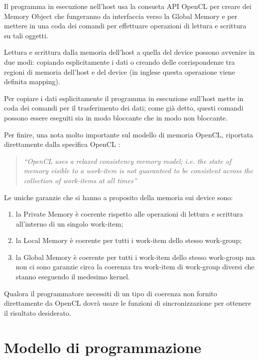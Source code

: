 \documentclass[12pt,a4paper,oneside]{book}
\begin{document}
Il programma in esecuzione nell'host usa la consueta \ac{API} \ac{OpenCL} per creare dei Memory Object che fungeranno da interfaccia verso la Global Memory e per mettere in una coda dei comandi per effettuare operazioni di lettura e scrittura su tali oggetti.

Lettura e scrittura dalla memoria dell'host a quella del device possono avvenire in due modi: copiando esplicitamente i dati o creando delle corrispondenze tra regioni di memoria dell'host e del device (in inglese questa operazione viene definita mapping).

Per copiare i dati esplicitamente il programma in esecuzione sull'host mette in coda dei comandi per il trasferimento dei dati; come già detto, questi comandi possono essere eseguiti sia in modo bloccante che in modo non bloccante.

Per finire, una nota molto importante sul modello di memoria \ac{OpenCL}, riportata direttamente dalla specifica \ac{OpenCL} \cite{bib:opencl}:

\begin{quote}
\textit{``OpenCL uses a relaxed consistency memory model; i.e. the state of memory visible to a work-item is not guaranteed to be consistent across the collection of work-items at all times''}
\end{quote}

Le uniche garanzie che si hanno a proposito della memoria sui device sono:
\begin{enumerate}
\item la Private Memory è coerente rispetto alle operazioni di lettura e scrittura all'interno di un singolo work-item;
\item la Local Memory è coerente per tutti i work-item dello stesso work-group;
\item la Global Memory è coerente per tutti i work-item dello stesso work-group ma non ci sono garanzie circa la coerenza tra work-item di work-group diversi che stanno eseguendo il medesimo kernel.
\end{enumerate}

Qualora il programmatore necessiti di un tipo di coerenza non fornito direttamente da \ac{OpenCL} dovrà usare le funzioni di sincronizzazione per ottenere il risultato desiderato.

\section{Modello di programmazione}
\end{document}
